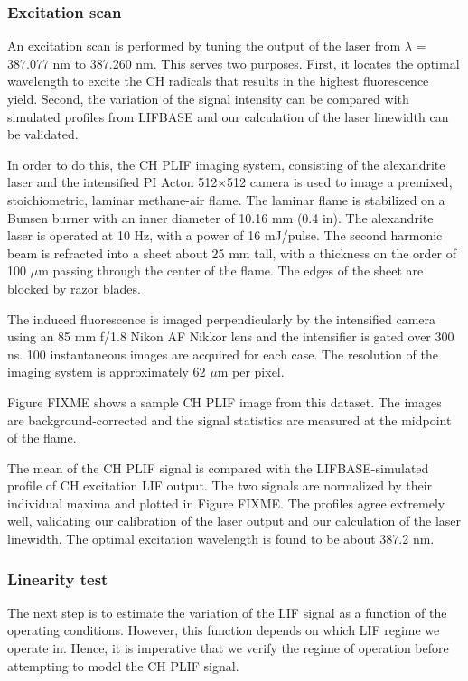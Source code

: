 \subsubsection{Excitation scan}

An excitation scan is performed by tuning the output of the laser from \(\lambda\) = 387.077 nm to 387.260 nm.
This serves two purposes.
First, it locates the optimal wavelength to excite the CH radicals that results in the highest fluorescence yield.
Second, the variation of the signal intensity can be compared with simulated profiles from LIFBASE and our calculation of the laser linewidth can be validated.

In order to do this, the CH PLIF imaging system, consisting of the alexandrite laser and the intensified PI Acton 512\(\times\)512 camera is used to image a premixed, stoichiometric, laminar methane-air flame.
The laminar flame is stabilized on a Bunsen burner with an inner diameter of 10.16 mm (0.4 in).
The alexandrite laser is operated at 10 Hz, with a power of 16 mJ/pulse.
The second harmonic beam is refracted into a sheet about 25 mm tall, with a thickness on the order of 100 \(\mu\)m passing through the center of the flame.
The edges of the sheet are blocked by razor blades.

The induced fluorescence is imaged perpendicularly by the intensified camera using an 85 mm f/1.8 Nikon AF Nikkor lens and the intensifier is gated over 300 ns.
100 instantaneous images are acquired for each case.
The resolution of the imaging system is approximately 62 \(\mu\)m per pixel.

Figure FIXME shows a sample CH PLIF image from this dataset.
The images are background-corrected and the signal statistics are measured at the midpoint of the flame.

The mean of the CH PLIF signal is compared with the LIFBASE-simulated profile of CH excitation LIF output.
The two signals are normalized by their individual maxima and plotted in Figure FIXME.
The profiles agree extremely well, validating our calibration of the laser output and our calculation of the laser linewidth.
The optimal excitation wavelength is found to be about 387.2 nm.

\subsubsection{Linearity test}

The next step is to estimate the variation of the LIF signal as a function of the operating conditions.
However, this function depends on which LIF regime we operate in.
Hence, it is imperative that we verify the regime of operation before attempting to model the CH PLIF signal.

